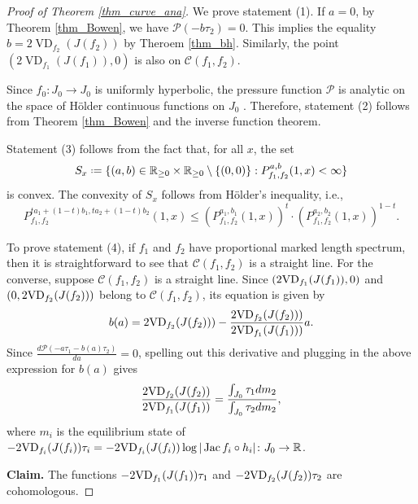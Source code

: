 \documentclass[11pt]{amsart}
\theoremstyle{plain}
\theoremstyle{definition}
\theoremstyle{remark}
\newcommand*{\defeq}{\mathrel{\vcenter{\baselineskip0.5ex \lineskiplimit0pt
			\hbox{\scriptsize.}\hbox{\scriptsize.}}}%
	=}
\DeclareMathOperator{\VD}{VD}
\DeclareMathOperator{\Jac}{Jac}
\begin{document}
\begin{proof}[Proof of Theorem \ref{thm_curve_ana}]
We prove statement (1).
If $a=0$, by Theorem \ref{thm_Bowen}, we have $\mathcal{P}(-b\tau_2) = 0$.
This implies 
the equality
$b = 2\VD_{f_2}(J(f_2))$ by Theroem \ref{thm_bh}.
Similarly, 
the point $(2\VD_{f_1}(J(f_1)),0)$ is also
on $\mathcal{C}(f_1,f_2)$. 

\medskip


Since $f_0 \colon J_0 \to J_0$ is uniformly hyperbolic, the pressure function $\mathcal{P}$ is analytic on the space of H\"older continuous functions on $J_0$
\cite{Parry90, Ruellebook,PU}.
Therefore, statement (2)
follows from
Theorem \ref{thm_Bowen}
and 
the inverse function theorem.

\medskip

Statement (3) follows from the fact that, for all $x$, the set
$$S_x
\defeq \{(a,b) \in \mathbb{R}_{\ge 0} \times \mathbb{R}_{\ge 0} \setminus \{(0,0)\} : P_{f_1,f_2}^{a,b}(1,x) < \infty\}$$ is convex. The convexity of $S_x$
follows from 
H\"older's inequality, i.e.,
$$P^{ta_1+(1-t)b_1,ta_2+(1-t)b_2}_{f_1,f_2}(1,x) \le \left(P^{a_1,b_1}_{f_1,f_2}(1,x)\right)^{t} \cdot \left(P^{a_2,b_2}_{f_1,f_2}(1,x)\right)^{1-t}.$$

\medskip

To prove statement (4), if $f_1$ and $f_2$ have
proportional marked length spectrum, then it is straightforward to see that $\mathcal{C}(f_1,f_2)$ is a straight line. 
For the converse, suppose $\mathcal{C}(f_1,f_2)$ is a straight line. 
Since $(2{\rm VD}_{f_1}(J(f_1)),0)$ and $(0,2{\rm VD}_{f_2}(J(f_2)))$ 
belong to $\mathcal{C}(f_1,f_2)$,
its equation is given by
$$b(a)
= 2{\rm VD}_{f_2}(J(f_2))) - \frac{2{\rm VD}_{f_2}(J(f_2)))}{2{\rm VD}_{f_1}(J(f_1)))}a.$$
Since $\frac{d\mathcal{P}(-a\tau_1-b(a) \tau_2)}{da} = 0$, spelling out this derivative and plugging in the above expression for $b(a)$ 
gives
\begin{equation}\label{eq_claim0}
\frac{2{\rm VD}_{f_2}(J(f_2))}{2{\rm VD}_{f_1}(J(f_1))} = \frac{\int_{J_0} \tau_1 dm_2}{\int_{J_0} \tau_2 dm_2},
\end{equation}
where $m_i$ is the equilibrium state of $-2{\rm VD}_{f_i}(J(f_i))\tau_i
=-2{\rm VD}_{f_i}(J(f_i))\log|\Jac f_i\circ h_i|\colon J_0 \to \mathbb{R}$.


\medskip

{\bf
Claim.} The functions
$-2{\rm VD}_{f_1}(J(f_1))
\tau_1$
and $-2{\rm VD}_{f_2}(J(f_2))
\tau_2$ 
are cohomologous.

\smallskip


\end{proof}
\end{document}
